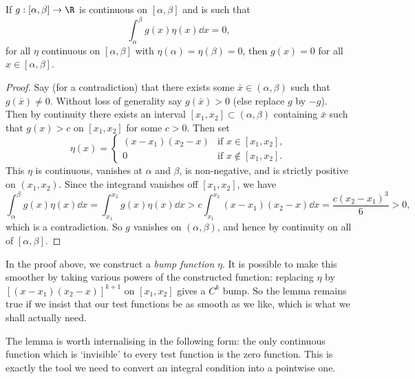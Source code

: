 \begin{lemma}\label{lem:fundamental}
	If $g: [\alpha, \beta] \rightarrow \R$ is continuous on $[\alpha, \beta]$ and is such that
	$$
	\int_{\alpha}^{\beta} g(x) \eta(x) \dd x = 0,
	$$
	for all $\eta$ continuous on $[\alpha, \beta]$ with $\eta(\alpha) = \eta(\beta) = 0$, then $g(x) = 0$ for all $x \in [\alpha, \beta]$.
\end{lemma}
\begin{proof}
	Say (for a contradiction) that there exists some $\bar{x} \in (\alpha, \beta)$ such that $g(\bar{x}) \neq 0$. Without loss of generality say $g(\bar{x}) > 0$ (else replace $g$ by $-g$). Then by continuity there exists an interval $[x_1, x_2] \subset (\alpha, \beta)$ containing $\bar{x}$ such that $g(x) > c$ on $[x_1, x_2]$ for some $c > 0$. Then set
	$$
	\eta(x) =
	\begin{cases}
		(x - x_1)(x_2 - x) &\mbox{if } x \in [x_1, x_2], \\
		0 &\mbox{if } x \not \in [x_1, x_2].
	   \end{cases}
	$$
	This $\eta$ is continuous, vanishes at $\alpha$ and $\beta$, is non-negative, and is strictly positive on $(x_1, x_2)$. Since the integrand vanishes off $[x_1, x_2]$, we have
	$$
	   \int_\alpha^\beta g(x) \eta(x) \dd x = \int_{x_1}^{x_2} g(x)\eta(x) \dd x > c \int_{x_1}^{x_2} (x - x_1)(x_2 - x) \dd x = \frac{c(x_2 - x_1)^3}{6} > 0,
	$$
	which is a contradiction. So $g$ vanishes on $(\alpha, \beta)$, and hence by continuity on all of $[\alpha, \beta]$.
\end{proof}

\begin{remark}
	In the proof above, we construct a \emph{bump function} $\eta$. It is possible to make this smoother by taking various powers of the constructed function: replacing $\eta$ by $\left[(x-x_1)(x_2-x)\right]^{k+1}$ on $[x_1, x_2]$ gives a $C^k$ bump. So the lemma remains true if we insist that our test functions be as smooth as we like, which is what we shall actually need.
\end{remark}

The lemma is worth internalising in the following form: the only continuous function which is `invisible' to every test function is the zero function. This is exactly the tool we need to convert an integral condition into a pointwise one.

